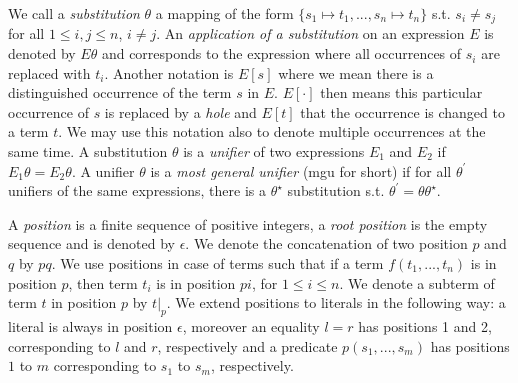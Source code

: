 We call a \textit{substitution} $\theta$ a mapping of the form $\{s_1\mapsto t_1, ..., s_n\mapsto t_n\}$ s.t. $s_i\neq s_j$ for all $1\le i, j\le n$, $i\neq j$. An \textit{application of a substitution} on an expression $E$ is denoted by $E\theta$ and corresponds to the expression where all occurrences of $s_i$ are replaced with $t_i$. Another notation is $E[s]$ where we mean there is a distinguished occurrence of the term $s$ in $E$. $E[\cdot]$ then means this particular occurrence of $s$ is replaced by a \textit{hole} and $E[t]$ that the occurrence is changed to a term $t$. We may use this notation also to denote multiple occurrences at the same time. A substitution $\theta$ is a \textit{unifier} of two expressions $E_1$ and $E_2$ if $E_1\theta=E_2\theta$. A unifier $\theta$ is a \textit{most general unifier} (mgu for short) if for all $\theta^\prime$ unifiers of the same expressions, there is a $\theta^\star$ substitution s.t. $\theta^\prime=\theta\theta^\star$.

A \textit{position} is a finite sequence of positive integers, a \textit{root position} is the empty sequence and is denoted by $\epsilon$. We denote the concatenation of two position $p$ and $q$ by $pq$. We use positions in case of terms such that if a term $f(t_1,...,t_n)$ is in position $p$, then term $t_i$ is in position $pi$, for $1\le i\le n$. We denote a subterm of term $t$ in position $p$ by $t|_p$. We extend positions to literals in the following way: a literal is always in position $\epsilon$, moreover an equality $l=r$ has positions 1 and 2, corresponding to $l$ and $r$, respectively and a predicate $p(s_1,...,s_m)$ has positions $1$ to $m$ corresponding to $s_1$ to $s_m$, respectively.

